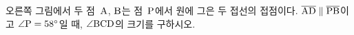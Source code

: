 \noindent\begin{minipage}[t]{0.58\linewidth}\vspace{0pt}\raggedright 오른쪽 그림에서 두 점~$\mathrm{A}$, $\mathrm{B}$는 점~$\mathrm{P}$에서 원에 그은 두 접선의 접점이다. $\overline{\mathrm{AD}}\parallel\overline{\mathrm{PB}}$이고 $\angle\mathrm{P}=58^\circ$일 때, $\angle\mathrm{BCD}$의 크기를 구하시오.\end{minipage}\hfill\begin{minipage}[t]{0.4\linewidth}\vspace{0pt}\centering \resizebox{\ifdim\width>\linewidth\linewidth\else\width\fi}{!}{}\end{minipage}\par
